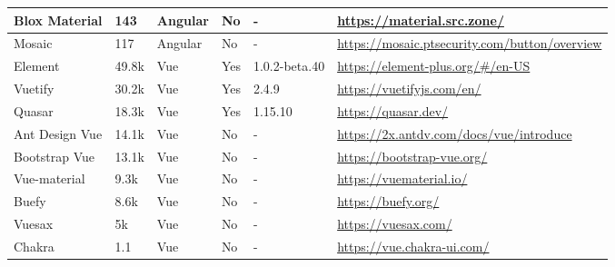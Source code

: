 \begin{table*}[t]
\begin{tabularx}{\textwidth}{p{} |p{} | p{} | p{} | p{} |p{}  }
		Blox Material           & 143                     & Angular               & No                & -                & \url{https://material.src.zone/}                                                 \\ \hline
		Mosaic                  & 117                     & Angular               & No                & -                & \url{https://mosaic.ptsecurity.com/button/overview }                             \\ \hline
		Element                 & 49.8k                   & Vue                   & Yes               & 1.0.2-beta.40    & \url{https://element-plus.org/\#/en-US}                                          \\ \hline
		Vuetify                 & 30.2k                   & Vue                   & Yes               & 2.4.9            & \url{https://vuetifyjs.com/en/}                                                  \\ \hline
		Quasar                  & 18.3k                   & Vue                   & Yes               & 1.15.10          & \url{https://quasar.dev/ }                                                       \\ \hline
		Ant Design Vue          & 14.1k                   & Vue                   & No                & -                & \url{https://2x.antdv.com/docs/vue/introduce }                                   \\ \hline
		Bootstrap Vue           & 13.1k                   & Vue                   & No                & -                & \url{https://bootstrap-vue.org/ }                                                \\ \hline
		Vue-material            & 9.3k                    & Vue                   & No                & -                & \url{https://vuematerial.io/ }                                                   \\ \hline
		Buefy                   & 8.6k                    & Vue                   & No                & -                & \url{https://buefy.org/ }                                                        \\ \hline
		Vuesax                  & 5k                      & Vue                   & No                & -                & \url{https://vuesax.com/ }                                                       \\ \hline
		Chakra                  & 1.1                     & Vue                   & No                & -                & \url{https://vue.chakra-ui.com/ }                                                \\ \hline

\end{tabularx}
\end{table*}
